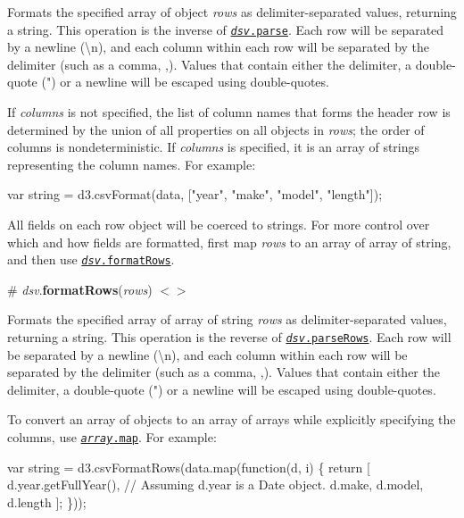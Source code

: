 Formats the specified array of object {\itshape rows} as delimiter-\/separated values, returning a string. This operation is the inverse of \href{#dsv_parse}{\tt {\itshape dsv}.parse}. Each row will be separated by a newline ({\ttfamily \textbackslash{}n}), and each column within each row will be separated by the delimiter (such as a comma, {\ttfamily ,}). Values that contain either the delimiter, a double-\/quote ({\ttfamily "}) or a newline will be escaped using double-\/quotes.

If {\itshape columns} is not specified, the list of column names that forms the header row is determined by the union of all properties on all objects in {\itshape rows}; the order of columns is nondeterministic. If {\itshape columns} is specified, it is an array of strings representing the column names. For example\+:


\begin{DoxyCode}
var string = d3.csvFormat(data, ["year", "make", "model", "length"]);
\end{DoxyCode}


All fields on each row object will be coerced to strings. For more control over which and how fields are formatted, first map {\itshape rows} to an array of array of string, and then use \href{#dsv_formatRows}{\tt {\itshape dsv}.format\+Rows}.

\label{_dsv_formatRows}%
\# {\itshape dsv}.{\bfseries format\+Rows}({\itshape rows}) \href{https://github.com/d3/d3-dsv/blob/master/src/dsv.js#L114}{\tt $<$$>$}

Formats the specified array of array of string {\itshape rows} as delimiter-\/separated values, returning a string. This operation is the reverse of \href{#dsv_parseRows}{\tt {\itshape dsv}.parse\+Rows}. Each row will be separated by a newline ({\ttfamily \textbackslash{}n}), and each column within each row will be separated by the delimiter (such as a comma, {\ttfamily ,}). Values that contain either the delimiter, a double-\/quote (") or a newline will be escaped using double-\/quotes.

To convert an array of objects to an array of arrays while explicitly specifying the columns, use \href{https://developer.mozilla.org/en-US/docs/Web/JavaScript/Reference/Global_Objects/Array/map}{\tt {\itshape array}.map}. For example\+:


\begin{DoxyCode}
var string = d3.csvFormatRows(data.map(function(d, i) \{
  return [
    d.year.getFullYear(), // Assuming d.year is a Date object.
    d.make,
    d.model,
    d.length
  ];
\}));
\end{DoxyCode}


